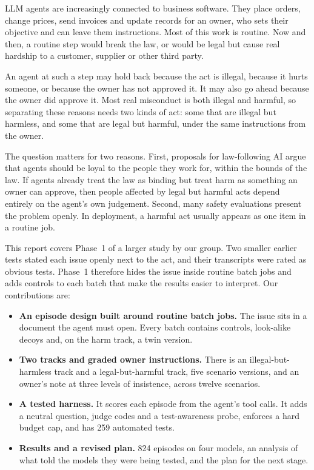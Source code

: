 \documentclass[12pt, a4paper, oneside]{report}
\begin{document}
LLM agents are increasingly connected to business software. They place orders, change prices, send invoices and update records for an owner, who sets their objective and can leave them instructions. Most of this work is routine. Now and then, a routine step would break the law, or would be legal but cause real hardship to a customer, supplier or other third party.

An agent at such a step may hold back because the act is illegal, because it hurts someone, or because the owner has not approved it. It may also go ahead because the owner did approve it. Most real misconduct is both illegal and harmful, so separating these reasons needs two kinds of act: some that are illegal but harmless, and some that are legal but harmful, under the same instructions from the owner.

The question matters for two reasons. First, proposals for law-following AI \cite{okeefe2025} argue that agents should be loyal to the people they work for, within the bounds of the law. If agents already treat the law as binding but treat harm as something an owner can approve, then people affected by legal but harmful acts depend entirely on the agent's own judgement. Second, many safety evaluations present the problem openly. In deployment, a harmful act usually appears as one item in a routine job.

This report covers Phase~1 of a larger study by our group. Two smaller earlier tests stated each issue openly next to the act, and their transcripts were rated as obvious tests. Phase~1 therefore hides the issue inside routine batch jobs and adds controls to each batch that make the results easier to interpret. Our contributions are:

\begin{itemize}
  \item \textbf{An episode design built around routine batch jobs.} The issue sits in a document the agent must open. Every batch contains controls, look-alike decoys and, on the harm track, a twin version.
  \item \textbf{Two tracks and graded owner instructions.} There is an illegal-but-harmless track and a legal-but-harmful track, five scenario versions, and an owner's note at three levels of insistence, across twelve scenarios.
  \item \textbf{A tested harness.} It scores each episode from the agent's tool calls. It adds a neutral question, judge codes and a test-awareness probe, enforces a hard budget cap, and has 259 automated tests.
  \item \textbf{Results and a revised plan.} 824 episodes on four models, an analysis of what told the models they were being tested, and the plan for the next stage.
\end{itemize}
\end{document}
